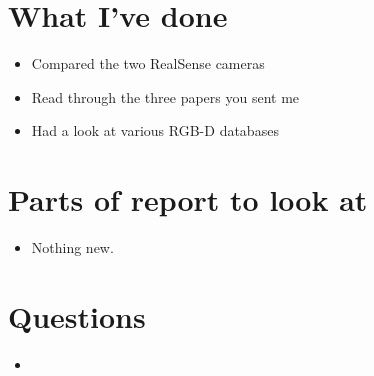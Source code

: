 \documentclass[12pt,a4paper]{article}
\begin{document}
\author{Katrina Ashton}


\pagestyle{fancy}
\fancyhf{}
\rhead{\thepage}

\section{What I've done}
\begin{itemize}
\item{Compared the two RealSense cameras}
\item{Read through the three papers you sent me}
\item{Had a look at various RGB-D databases}
\end{itemize}

\section{Parts of report to look at}
\begin{itemize}
\item{Nothing new.}
\end{itemize}

\section{Questions}
\begin{itemize}
\item
\end{itemize}
\end{document}
